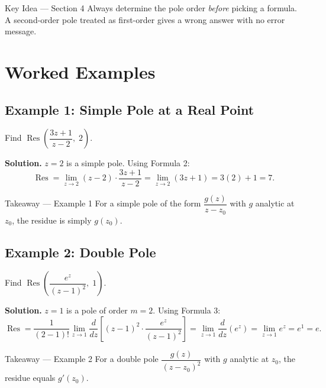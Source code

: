 \documentclass[12pt,a4paper]{article}
\begin{document}
\begin{learnbox}{Key Idea --- Section 4}
Always determine the pole order \emph{before} picking a formula.  A second-order pole treated
as first-order gives a wrong answer with no error message.
\end{learnbox}

\section{Worked Examples}

\subsection*{Example 1: Simple Pole at a Real Point}

Find $\operatorname{Res}\!\left(\dfrac{3z+1}{z-2},\; 2\right)$.

\textbf{Solution.}
$z = 2$ is a simple pole.  Using Formula 2:
\[
   \operatorname{Res} = \lim_{z\to 2}(z-2)\cdot\frac{3z+1}{z-2}
   = \lim_{z\to 2}(3z+1) = 3(2)+1 = 7.
\]

\begin{learnbox}{Takeaway --- Example 1}
For a simple pole of the form $\dfrac{g(z)}{z-z_0}$ with $g$ analytic at $z_0$, the residue
is simply $g(z_0)$.
\end{learnbox}

\subsection*{Example 2: Double Pole}

Find $\operatorname{Res}\!\left(\dfrac{e^z}{(z-1)^2},\; 1\right)$.

\textbf{Solution.}
$z = 1$ is a pole of order $m = 2$.  Using Formula 3:
\[
   \operatorname{Res} = \frac{1}{(2-1)!}\lim_{z\to 1}\frac{d}{dz}\!\left[(z-1)^2\cdot\frac{e^z}{(z-1)^2}\right]
   = \lim_{z\to 1}\frac{d}{dz}(e^z)
   = \lim_{z\to 1} e^z = e^1 = e.
\]

\begin{learnbox}{Takeaway --- Example 2}
For a double pole $\dfrac{g(z)}{(z-z_0)^2}$ with $g$ analytic at $z_0$, the residue equals $g'(z_0)$.
\end{learnbox}
\end{document}
